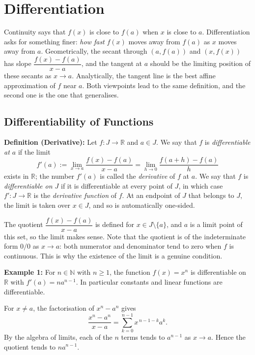 \documentclass[a4paper,11pt,abstracton]{scrartcl}
\newcommand{\RR}{\mathbb{R}}
\newcommand{\NN}{\mathbb{N}}
\theoremstyle{dotlessP}
\theoremstyle{dotlessS}
\theoremstyle{remark}
\theoremstyle{definition}
\begin{document}
\section{Differentiation}

Continuity says that $f(x)$ is close to $f(a)$ when $x$ is close to $a$. Differentiation asks for something finer: \emph{how fast} $f(x)$ moves away from $f(a)$ as $x$ moves away from $a$. Geometrically, the secant through $(a,f(a))$ and $(x,f(x))$ has slope $\dfrac{f(x)-f(a)}{x-a}$, and the tangent at $a$ should be the limiting position of these secants as $x\to a$. Analytically, the tangent line is the best affine approximation of $f$ near $a$. Both viewpoints lead to the same definition, and the second one is the one that generalises.

\subsection{Differentiability of Functions}

\begin{problem_box}
\textbf{Definition (Derivative):}
Let $f:J\to\RR$ and $a\in J$. We say that $f$ is \emph{differentiable at $a$} if the limit
\[
    f'(a):=\lim_{x\to a}\frac{f(x)-f(a)}{x-a}=\lim_{h\to0}\frac{f(a+h)-f(a)}{h}
\]
exists in $\RR$; the number $f'(a)$ is called the \emph{derivative} of $f$ at $a$. We say that $f$ is \emph{differentiable on $J$} if it is differentiable at every point of $J$, in which case $f':J\to\RR$ is the \emph{derivative function} of $f$. At an endpoint of $J$ that belongs to $J$, the limit is taken over $x\in J$, and so is automatically one-sided.
\end{problem_box}

The quotient $\dfrac{f(x)-f(a)}{x-a}$ is defined for $x\in J\setminus\{a\}$, and $a$ is a limit point of this set, so the limit makes sense. Note that the quotient is of the indeterminate form $0/0$ as $x\to a$: both numerator and denominator tend to zero when $f$ is continuous. This is why the existence of the limit is a genuine condition.

\begin{example_box}
\textbf{Example 1:} For $n\in\NN$ with $n\ge1$, the function $f(x)=x^n$ is differentiable on $\RR$ with $f'(a)=na^{n-1}$. In particular constants and linear functions are differentiable.
\end{example_box}
\begin{example_claim_box}
For $x\ne a$, the factorisation of $x^n-a^n$ gives
\[
    \frac{x^n-a^n}{x-a}=\sum_{k=0}^{n-1}x^{\,n-1-k}a^{k}.
\]
By the algebra of limits, each of the $n$ terms tends to $a^{n-1}$ as $x\to a$. Hence the quotient tends to $na^{n-1}$.
\end{example_claim_box}
\end{document}
